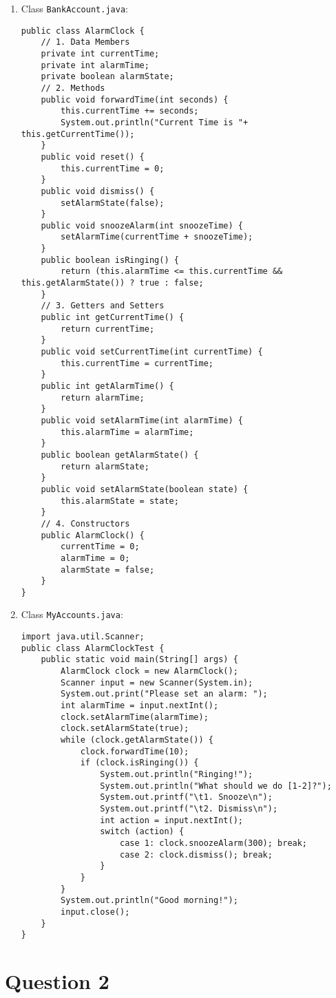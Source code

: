 \documentclass[12pt,letterpaper,twoside]{article}
\begin{document}
\begin{enumerate}
\item Class \texttt{BankAccount.java}:
\lstset{language=java}
\begin{lstlisting}
public class AlarmClock {
	// 1. Data Members
	private int currentTime;
	private int alarmTime;
	private boolean alarmState;
	// 2. Methods
	public void forwardTime(int seconds) {
		this.currentTime += seconds;
		System.out.println("Current Time is "+ this.getCurrentTime());
	}
	public void reset() {
		this.currentTime = 0;
	}
	public void dismiss() {
		setAlarmState(false);
	}
	public void snoozeAlarm(int snoozeTime) {
		setAlarmTime(currentTime + snoozeTime);
	}
	public boolean isRinging() {
		return (this.alarmTime <= this.currentTime && this.getAlarmState()) ? true : false;
	}
	// 3. Getters and Setters
	public int getCurrentTime() {
		return currentTime;
	}
	public void setCurrentTime(int currentTime) {
		this.currentTime = currentTime;
	}
	public int getAlarmTime() {
		return alarmTime;
	}
	public void setAlarmTime(int alarmTime) {
		this.alarmTime = alarmTime;
	}
	public boolean getAlarmState() {
		return alarmState;
	}
	public void setAlarmState(boolean state) {
		this.alarmState = state;
	}
	// 4. Constructors
	public AlarmClock() {
		currentTime = 0;
		alarmTime = 0;
		alarmState = false;
	}
}
\end{lstlisting}
\item Class \texttt{MyAccounts.java}:
\lstset{language=java}
\begin{lstlisting}
import java.util.Scanner;
public class AlarmClockTest {
	public static void main(String[] args) {
		AlarmClock clock = new AlarmClock();
		Scanner input = new Scanner(System.in);
		System.out.print("Please set an alarm: ");
		int alarmTime = input.nextInt();
		clock.setAlarmTime(alarmTime);
		clock.setAlarmState(true);
		while (clock.getAlarmState()) {
			clock.forwardTime(10);
			if (clock.isRinging()) {
				System.out.println("Ringing!");
				System.out.println("What should we do [1-2]?");
				System.out.printf("\t1. Snooze\n");
				System.out.printf("\t2. Dismiss\n");
				int action = input.nextInt();
				switch (action) {
					case 1: clock.snoozeAlarm(300); break;
					case 2: clock.dismiss(); break;
				}
			}
		}
		System.out.println("Good morning!");
		input.close();
	}
}
\end{lstlisting}
\end{enumerate}

\section*{Question 2}
\end{document}
